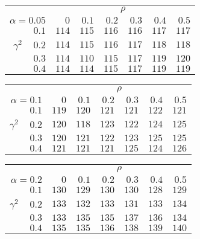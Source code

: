 \begin{tabular}{r|rrrrrr}
\hline\hline
 &\multicolumn{6}{c}{$\rho$} \\ 
 $\alpha = 0.05$ & $0$ & $0.1$ & $0.2$ & $0.3$ & $0.4$ & $0.5$ \\ 
 \hline$0.1$ & $114$ & $115$ & $116$ & $116$ & $117$ & $117$\\ 
$\gamma^2\;\;\;$ $0.2$ & $114$ & $115$ & $116$ & $117$ & $118$ & $118$\\ 
$0.3$ & $114$ & $110$ & $115$ & $117$ & $119$ & $120$\\ 
$0.4$ & $114$ & $114$ & $115$ & $117$ & $119$ & $119$\\ 
 \hline 
 \end{tabular}
 
 \vspace{2em} 
 
\begin{tabular}{r|rrrrrr}
\hline\hline
 &\multicolumn{6}{c}{$\rho$} \\ 
 $\alpha = 0.1$ & $0$ & $0.1$ & $0.2$ & $0.3$ & $0.4$ & $0.5$ \\ 
 \hline$0.1$ & $119$ & $120$ & $121$ & $121$ & $122$ & $121$\\ 
$\gamma^2\;\;\;$ $0.2$ & $120$ & $118$ & $123$ & $122$ & $124$ & $125$\\ 
$0.3$ & $120$ & $121$ & $122$ & $123$ & $125$ & $125$\\ 
$0.4$ & $121$ & $121$ & $121$ & $125$ & $124$ & $126$\\ 
 \hline 
 \end{tabular}
 
 \vspace{2em} 
 
\begin{tabular}{r|rrrrrr}
\hline\hline
 &\multicolumn{6}{c}{$\rho$} \\ 
 $\alpha = 0.2$ & $0$ & $0.1$ & $0.2$ & $0.3$ & $0.4$ & $0.5$ \\ 
 \hline$0.1$ & $130$ & $129$ & $130$ & $130$ & $128$ & $129$\\ 
$\gamma^2\;\;\;$ $0.2$ & $133$ & $132$ & $133$ & $131$ & $133$ & $134$\\ 
$0.3$ & $133$ & $135$ & $135$ & $137$ & $136$ & $134$\\ 
$0.4$ & $135$ & $135$ & $136$ & $138$ & $139$ & $140$\\ 
 \hline 
 \end{tabular}